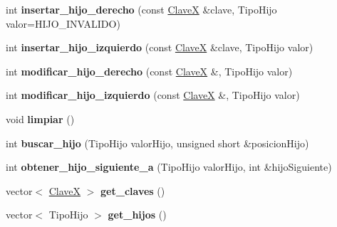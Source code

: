 \begin{DoxyCompactItemize}
\item 
\hypertarget{class_nodo_interno_a8f7a00cad331cf055fc88ab4bfe5e8f7}{int {\bfseries insertar\-\_\-hijo\-\_\-derecho} (const \hyperlink{class_clave_x}{\-Clave\-X} \&clave, \-Tipo\-Hijo valor=\-H\-I\-J\-O\-\_\-\-I\-N\-V\-A\-L\-I\-D\-O)}\label{class_nodo_interno_a8f7a00cad331cf055fc88ab4bfe5e8f7}

\item 
\hypertarget{class_nodo_interno_ada6e08333096a372b3b4ee258d69d251}{int {\bfseries insertar\-\_\-hijo\-\_\-izquierdo} (const \hyperlink{class_clave_x}{\-Clave\-X} \&clave, \-Tipo\-Hijo valor)}\label{class_nodo_interno_ada6e08333096a372b3b4ee258d69d251}

\item 
\hypertarget{class_nodo_interno_a4d24df1f2ab05ee951c97a0e7c269f85}{int {\bfseries modificar\-\_\-hijo\-\_\-derecho} (const \hyperlink{class_clave_x}{\-Clave\-X} \&, \-Tipo\-Hijo valor)}\label{class_nodo_interno_a4d24df1f2ab05ee951c97a0e7c269f85}

\item 
\hypertarget{class_nodo_interno_ad5c9d273aa9b3b1615a2760d67ff5416}{int {\bfseries modificar\-\_\-hijo\-\_\-izquierdo} (const \hyperlink{class_clave_x}{\-Clave\-X} \&, \-Tipo\-Hijo valor)}\label{class_nodo_interno_ad5c9d273aa9b3b1615a2760d67ff5416}

\item 
\hypertarget{class_nodo_interno_aa22ed222f4a433aa8713831d6030268f}{void {\bfseries limpiar} ()}\label{class_nodo_interno_aa22ed222f4a433aa8713831d6030268f}

\item 
\hypertarget{class_nodo_interno_a152bbe93e989a064289e11fd3af2b6b3}{int {\bfseries buscar\-\_\-hijo} (\-Tipo\-Hijo valor\-Hijo, unsigned short \&posicion\-Hijo)}\label{class_nodo_interno_a152bbe93e989a064289e11fd3af2b6b3}

\item 
\hypertarget{class_nodo_interno_adf1d1a474e815f9d01be7f73e51b423a}{int {\bfseries obtener\-\_\-hijo\-\_\-siguiente\-\_\-a} (\-Tipo\-Hijo valor\-Hijo, int \&hijo\-Siguiente)}\label{class_nodo_interno_adf1d1a474e815f9d01be7f73e51b423a}

\item 
\hypertarget{class_nodo_interno_a04fe50416fd32cd4ee29bdf0510a860b}{vector$<$ \hyperlink{class_clave_x}{\-Clave\-X} $>$ {\bfseries get\-\_\-claves} ()}\label{class_nodo_interno_a04fe50416fd32cd4ee29bdf0510a860b}

\item 
\hypertarget{class_nodo_interno_ab005e00bb770e14416cd9a7c0aade85d}{vector$<$ \-Tipo\-Hijo $>$ {\bfseries get\-\_\-hijos} ()}\label{class_nodo_interno_ab005e00bb770e14416cd9a7c0aade85d}


\end{DoxyCompactItemize}

